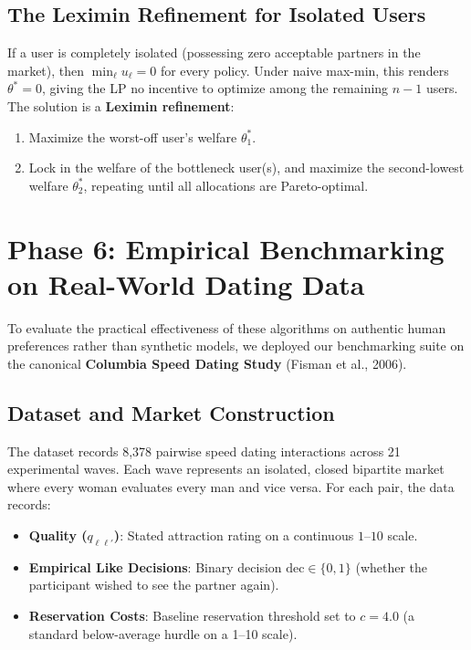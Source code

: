 \documentclass[11pt,letterpaper]{article}
\theoremstyle{definition}
\theoremstyle{plain}
\theoremstyle{remark}
\begin{document}
\subsection{The Leximin Refinement for Isolated Users}
If a user is completely isolated (possessing zero acceptable partners in the market), then $\min_\ell u_\ell = 0$ for every policy. Under naive max-min, this renders $\theta^* = 0$, giving the LP no incentive to optimize among the remaining $n-1$ users.
The solution is a \textbf{Leximin refinement}:
\begin{enumerate}[leftmargin=2em]
    \item Maximize the worst-off user's welfare $\theta_1^*$.
    \item Lock in the welfare of the bottleneck user(s), and maximize the second-lowest welfare $\theta_2^*$, repeating until all allocations are Pareto-optimal.
\end{enumerate}

\newpage
\section{Phase 6: Empirical Benchmarking on Real-World Dating Data}
\label{sec:empirical}

To evaluate the practical effectiveness of these algorithms on authentic human preferences rather than synthetic models, we deployed our benchmarking suite on the canonical \textbf{Columbia Speed Dating Study} (Fisman et al., 2006).

\subsection{Dataset and Market Construction}
The dataset records 8,378 pairwise speed dating interactions across 21 experimental waves. Each wave represents an isolated, closed bipartite market where every woman evaluates every man and vice versa. 
For each pair, the data records:
\begin{itemize}[leftmargin=2em]
    \item \textbf{Quality ($q_{\ell\ell'}$)}: Stated attraction rating on a continuous $1\text{--}10$ scale.
    \item \textbf{Empirical Like Decisions}: Binary decision $\mathrm{dec} \in \{0, 1\}$ (whether the participant wished to see the partner again).
    \item \textbf{Reservation Costs}: Baseline reservation threshold set to $c = 4.0$ (a standard below-average hurdle on a 1--10 scale).
\end{itemize}
\end{document}
